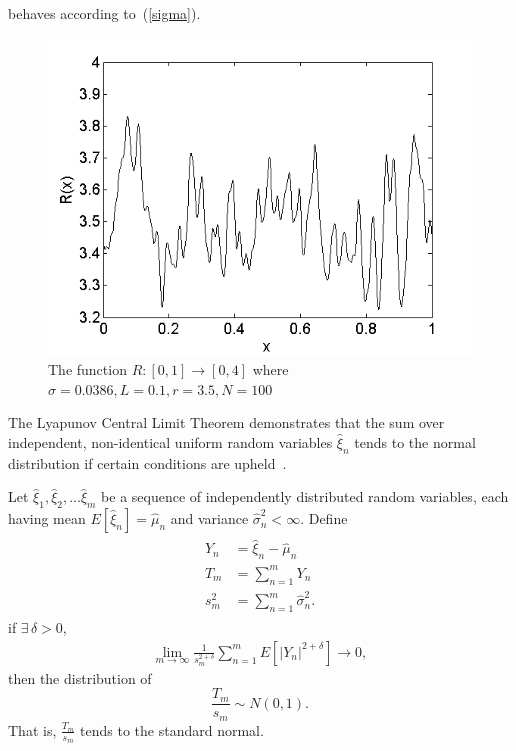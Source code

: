behaves according to~(\ref{sigma}).
\begin{figure}[!h]
\caption[The function $R(x)$]{The function $R:[0,1]\to [0,4]$ where
  $\sigma=0.0386, L=0.1, r=3.5, N=100$}\label{fig:R}
	\begin{center}
		\includegraphics[scale=0.6]{figs/xi.png}
	\end{center}
\end{figure}

The Lyapunov Central Limit Theorem demonstrates that
the sum over independent, non-identical uniform random variables
$\hat{\xi}_n$ tends to the normal distribution if certain conditions
are upheld~\cite{billingsley}. 

\begin{singlespacing}
\begin{theorem}\label{clt}
Let $\hat{\xi}_1, \hat{\xi}_2, ...\hat{\xi}_m$ be a sequence of independently distributed random
variables, each having mean $E[\hat{\xi}_n]=\hat{\mu}_n$ and variance
$\hat{\sigma}_n^2 < \infty$. Define
\begin{align*}
\begin{split}
Y_n &=\hat{\xi}_n - \hat{\mu}_n\\
T_m &= \sum_{n=1}^{m}Y_n\\
s_m^2 &=\sum_{n=1}^m\hat{\sigma}_n^2.
\end{split}
\end{align*}
if $\exists\, \delta>0$,
\begin{align*}
\lim_{m\to \infty}\frac{1}{s_m^{2+\delta}}\sum_{n=1}^mE[|Y_n|^{2+\delta}] \to 0,
\end{align*}
then the distribution of
\begin{equation*}
\frac{T_m}{s_m} \sim N(0,1).
\end{equation*}
That is, $\frac{T_m}{s_m}$ tends to the standard normal.
\end{theorem}
\end{singlespacing}

